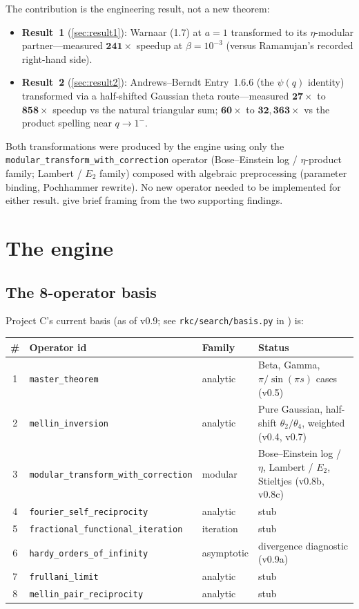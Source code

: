 \documentclass[11pt,reqno]{amsart}
\theoremstyle{definition}
\begin{document}
The contribution is the engineering result, not a new theorem:
\begin{itemize}
\item \textbf{Result~1} (\cref{sec:result1}): Warnaar (1.7) at $a=1$
  transformed to its $\eta$-modular partner---measured
  $\mathbf{241\times}$ speedup at $\beta = 10^{-3}$ (versus
  Ramanujan's recorded right-hand side).
\item \textbf{Result~2} (\cref{sec:result2}): Andrews--Berndt
  Entry~1.6.6 (the $\psi(q)$ identity) transformed via a
  half-shifted Gaussian theta route---measured $\mathbf{27\times}$
  to $\mathbf{858\times}$ speedup vs the natural triangular sum;
  $\mathbf{60\times}$ to $\mathbf{32{,}363\times}$ vs the product
  spelling near $q \to 1^-$.
\end{itemize}
Both transformations were produced by the engine using only the
\verb|modular_transform_with_correction| operator (Bose--Einstein log
/ $\eta$-product family; Lambert / $E_2$ family) composed with
algebraic preprocessing (parameter binding, Pochhammer rewrite). No
new operator needed to be implemented for either result.
 give brief framing from the
two supporting findings.

\section{The engine}\label{sec:engine}

\subsection{The 8-operator basis}\label{sec:basis}

Project C's current basis (as of v0.9; see
\verb|rkc/search/basis.py| in \cite{ProjectC}) is:

\begin{center}
\small
\begin{tabular}{c l l l}
\toprule
\# & Operator id & Family & Status \\
\midrule
1 & \verb|master_theorem|                       & analytic   & Beta, Gamma, $\pi/\sin(\pi s)$ cases (v0.5) \\
2 & \verb|mellin_inversion|                     & analytic   & Pure Gaussian, half-shift $\theta_2/\theta_4$, weighted (v0.4, v0.7) \\
3 & \verb|modular_transform_with_correction|    & modular    & Bose--Einstein log / $\eta$, Lambert / $E_2$, Stieltjes (v0.8b, v0.8c) \\
4 & \verb|fourier_self_reciprocity|             & analytic   & stub \\
5 & \verb|fractional_functional_iteration|      & iteration  & stub \\
6 & \verb|hardy_orders_of_infinity|             & asymptotic & divergence diagnostic (v0.9a) \\
7 & \verb|frullani_limit|                       & analytic   & stub \\
8 & \verb|mellin_pair_reciprocity|              & analytic   & stub \\
\bottomrule
\end{tabular}
\end{center}
\end{document}
